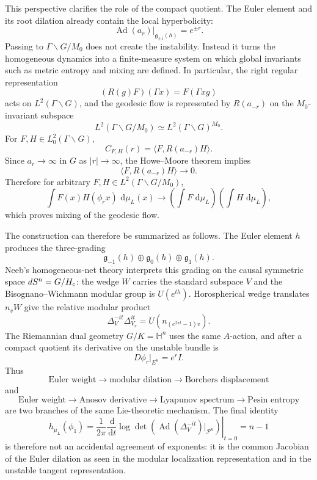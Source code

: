 \documentclass[a4paper,11pt]{article}
\theoremstyle{definition}
\newcommand{\dd}{\,\mathrm{d}}
\newcommand{\Ad}{\operatorname{Ad}}
\begin{document}
This perspective clarifies the role of the compact quotient.  The Euler element and its
root dilation already contain the local hyperbolicity:
\[
\Ad(a_r)|_{\mathfrak g_{\pm1}(h)}=e^{\pm r}.
\]
Passing to \(\Gamma\backslash G/M_0\) does not create the instability.  Instead it turns
the homogeneous dynamics into a finite-measure system on which global invariants such as
metric entropy and mixing are defined.  In particular, the right regular representation
\[
(R(g)F)(\Gamma x)=F(\Gamma xg)
\]
acts on \(L^2(\Gamma\backslash G)\), and the geodesic flow is represented by
\(R(a_{-r})\) on the \(M_0\)-invariant subspace
\[
L^2(\Gamma\backslash G/M_0)
\simeq
L^2(\Gamma\backslash G)^{M_0}.
\]
For \(F,H\in L^2_0(\Gamma\backslash G)\),
\[
C_{F,H}(r)
=
\langle F,R(a_{-r})H\rangle.
\]
Since \(a_r\to\infty\) in \(G\) as \(|r|\to\infty\), the Howe--Moore theorem implies
\begin{equation}
\langle F,R(a_{-r})H\rangle\longrightarrow0.
\label{eq:howe-moore}
\end{equation}
Therefore for arbitrary \(F,H\in L^2(\Gamma\backslash G/M_0)\),
\begin{equation}
\int F(x)H(\phi_rx)\,\dd\mu_L(x)
\longrightarrow
\left(\int F\,\dd\mu_L\right)
\left(\int H\,\dd\mu_L\right),
\label{eq:mixing}
\end{equation}
which proves mixing of the geodesic flow.

The construction can therefore be summarized as follows.  The Euler element \(h\)
produces the three-grading
\[
\mathfrak g_{-1}(h)\oplus\mathfrak g_0(h)\oplus\mathfrak g_1(h).
\]
Neeb's homogeneous-net theory interprets this grading on the causal symmetric space
\(dS^n=G/H_{\rm c}\): the wedge \(W\) carries the standard subspace \(V\) and the
Bisognano--Wichmann modular group is \(U(e^{th})\).  Horospherical wedge translates
\(n_vW\) give the relative modular product
\[
\Delta_V^{-it}\Delta_{V_v}^{it}
=
U(n_{(e^{2\pi t}-1)v}).
\]
The Riemannian dual geometry \(G/K=\mathbb H^n\) uses the same \(A\)-action, and after a
compact quotient its derivative on the unstable bundle is
\[
D\phi_r|_{E^u}
=
e^rI.
\]
Thus
\[
\text{Euler weight}
\longrightarrow
\text{modular dilation}
\longrightarrow
\text{Borchers displacement}
\]
and
\[
\text{Euler weight}
\longrightarrow
\text{Anosov derivative}
\longrightarrow
\text{Lyapunov spectrum}
\longrightarrow
\text{Pesin entropy}
\]
are two branches of the same Lie-theoretic mechanism.  The final identity
\[
h_{\mu_L}(\phi_1)
=
\frac{1}{2\pi}
\left.
\frac{\dd}{\dd t}
\log
\det\left(
\Ad(\Delta_V^{-it})|_{\mathcal P^u}
\right)
\right|_{t=0}
=
n-1
\]
is therefore not an accidental agreement of exponents: it is the common Jacobian of the
Euler dilation as seen in the modular localization representation and in the unstable
tangent representation.
\end{document}
